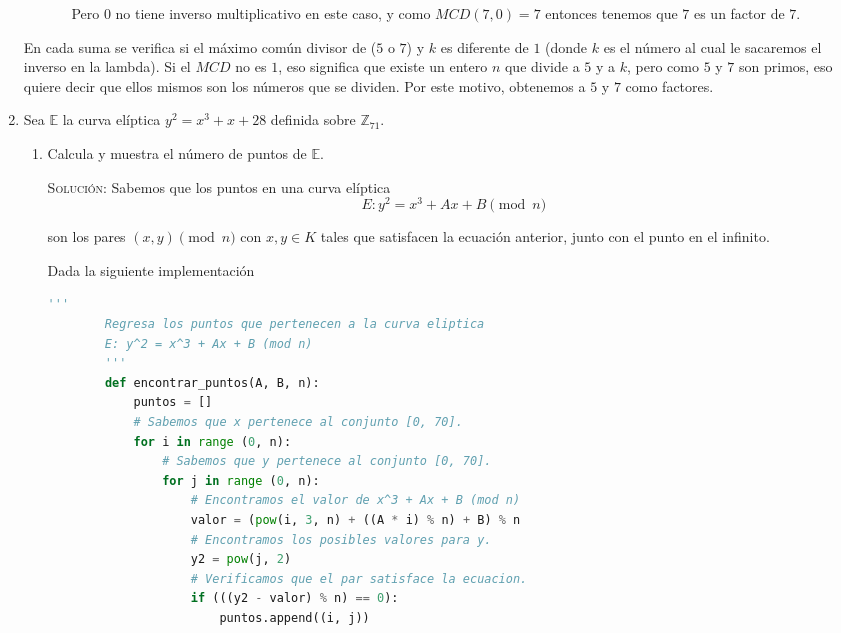 \documentclass[letterpaper,11pt]{article}
\begin{document}
\begin{enumerate}
\begin{enumerate}
\begin{itemize}
            Pero $0$ no tiene inverso multiplicativo en este caso, y como 
            $MCD(7, 0) = 7$ entonces tenemos que $7$ es un factor de $7$.
        \end{itemize}
    \end{enumerate}

    En cada suma se verifica si el máximo común divisor de ($5$ o $7$) y $k$ es 
    diferente de $1$ (donde $k$ es el número al cual le sacaremos el inverso en 
    la lambda). Si el $MCD$ no es $1$, eso significa que existe un entero $n$ 
    que divide a $5$ y a $k$, pero como $5$ y $7$ son primos, eso quiere decir 
    que ellos mismos son los números que se dividen. Por este motivo, obtenemos 
    a $5$ y $7$ como factores.

    \item Sea $\mathbb{E}$ la curva elíptica $y^2 = x^3 + x + 28$ definida sobre 
    $\mathbb{Z}_{71}$. 
    \begin{enumerate}
        \item Calcula y muestra el número de puntos de $\mathbb{E}$.
        
        \textsc{Solución:} Sabemos que los puntos en una curva elíptica 
        \begin{equation*}
            E : y^2 = x^3 + Ax + B \pmod{n}
        \end{equation*}
        
        son los pares $(x, y) \pmod{n}$ con $x, y \in K$ tales que satisfacen
        la ecuación anterior, junto con el punto en el infinito. 
        
        Dada la siguiente implementación
        \begin{lstlisting}[language = Python]
        '''
        Regresa los puntos que pertenecen a la curva eliptica 
        E: y^2 = x^3 + Ax + B (mod n)
        '''
        def encontrar_puntos(A, B, n):
            puntos = []
            # Sabemos que x pertenece al conjunto [0, 70].
            for i in range (0, n):
                # Sabemos que y pertenece al conjunto [0, 70]. 
                for j in range (0, n):
                    # Encontramos el valor de x^3 + Ax + B (mod n)
                    valor = (pow(i, 3, n) + ((A * i) % n) + B) % n
                    # Encontramos los posibles valores para y.
                    y2 = pow(j, 2)
                    # Verificamos que el par satisface la ecuacion.
                    if (((y2 - valor) % n) == 0):
                        puntos.append((i, j))
            

\end{lstlisting}
\end{enumerate}
\end{enumerate}
\end{document}
